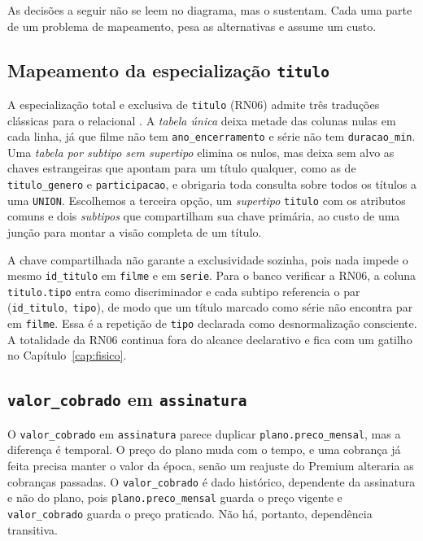 \documentclass[a4paper,12pt,oneside,openany]{book}
\newcommand{\bd}[1]{\texttt{#1}}
\begin{document}
As decisões a seguir não se leem no diagrama, mas o sustentam. Cada uma parte
de um problema de mapeamento, pesa as alternativas e assume um custo.

\subsection{Mapeamento da especialização \bd{titulo}}\label{sec:especializacao}

A especialização total e exclusiva de \bd{titulo} (RN06) admite três traduções
clássicas para o relacional \citep{elmasri2019}. A \emph{tabela única} deixa
metade das colunas nulas em cada linha, já que filme não tem
\bd{ano\_encerramento} e série não tem \bd{duracao\_min}. Uma \emph{tabela por
subtipo sem supertipo} elimina os nulos, mas deixa sem alvo as chaves
estrangeiras que apontam para um título qualquer, como as de \bd{titulo\_genero}
e \bd{participacao}, e obrigaria toda consulta sobre todos os títulos a uma
\bd{UNION}. Escolhemos a terceira opção, um \emph{supertipo} \bd{titulo} com os
atributos comuns e dois \emph{subtipos} que compartilham sua chave primária, ao
custo de uma junção para montar a visão completa de um título.

A chave compartilhada não garante a exclusividade sozinha, pois nada impede o
mesmo \bd{id\_titulo} em \bd{filme} e em \bd{serie}. Para o banco verificar a
RN06, a coluna \bd{titulo.tipo} entra como discriminador e cada subtipo
referencia o par \mbox{(\bd{id\_titulo}, \bd{tipo})}, de modo que um título
marcado como série não encontra par em \bd{filme}. Essa é a repetição de
\bd{tipo} declarada como desnormalização consciente. A totalidade da RN06
continua fora do alcance declarativo e fica com um gatilho no
Capítulo~\ref{cap:fisico}.

\subsection{\bd{valor\_cobrado} em \bd{assinatura}}\label{sec:valor-cobrado}

O \bd{valor\_cobrado} em \bd{assinatura} parece duplicar
\bd{plano.preco\_mensal}, mas a diferença é temporal. O preço do plano muda com
o tempo, e uma cobrança já feita precisa manter o valor da época, senão um
reajuste do Premium alteraria as cobranças passadas. O \bd{valor\_cobrado} é
dado histórico, dependente da assinatura e não do plano, pois
\bd{plano.preco\_mensal} guarda o preço vigente e \bd{valor\_cobrado} guarda o
preço praticado. Não há, portanto, dependência transitiva.
\end{document}
